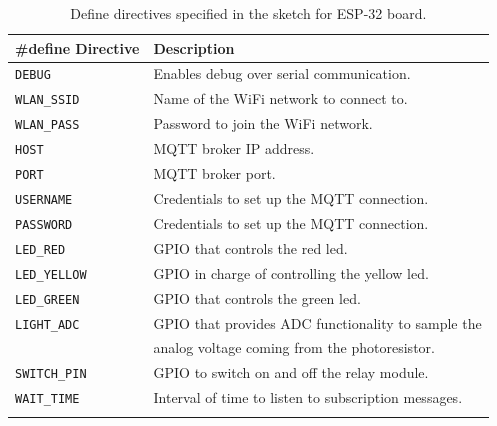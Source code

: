 \noindent\begin{minipage}{\textwidth}
	\begingroup
	\setlength{\LTleft}{-20cm plus -1fill}
	\setlength{\LTright}{\LTleft}
	\begin{longtable}{l | l}
		\hline
		\textbf{\#define Directive} & \textbf{Description} \\
		\hline
		\hline
		\texttt{DEBUG} & Enables debug over serial communication. \\
		\hline
		\texttt{WLAN\_SSID} & Name of the WiFi network to connect to. \\
		\texttt{WLAN\_PASS} & Password to join the WiFi network. \\ 
		\hline
		\texttt{HOST} & MQTT broker IP address. \\
		\texttt{PORT} & MQTT broker port. \\
		\texttt{USERNAME} & Credentials to set up the MQTT connection. \\
		\texttt{PASSWORD} & Credentials to set up the MQTT connection. \\
		\hline
		\texttt{LED\_RED}    & GPIO that controls the red led. \\
		\texttt{LED\_YELLOW} & GPIO in charge of controlling the yellow led. \\
		\texttt{LED\_GREEN} & GPIO that controls the green led. \\
		\hline
		\texttt{LIGHT\_ADC} & GPIO that provides ADC functionality to sample the \\
							& analog voltage coming from the photoresistor. \\
		\hline
		\texttt{SWITCH\_PIN} & GPIO to switch on and off the relay module. \\
		\hline
		\texttt{WAIT\_TIME} & Interval of time to listen to subscription messages. \\
		\hline
		
		\caption{Define directives specified in the sketch for ESP-32 board.}
		\label{esp32_code_defines}
	\end{longtable}
	\endgroup
\end{minipage}

